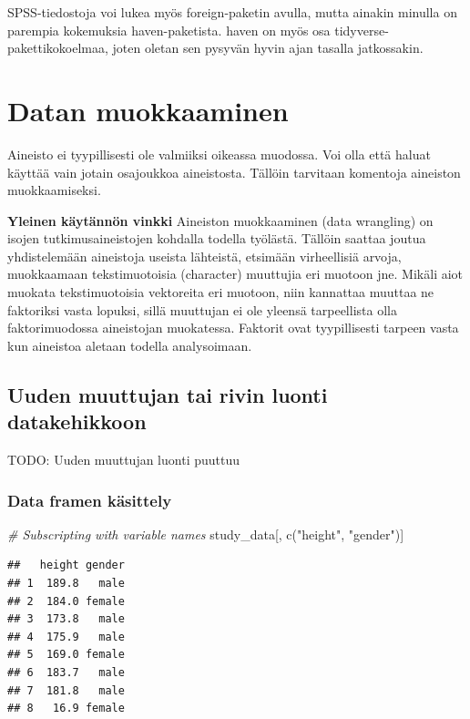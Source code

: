 \documentclass[
]{book}
\newenvironment{Shaded}{\begin{snugshade}}{\end{snugshade}}
\newcommand{\CommentTok}[1]{\textcolor[rgb]{0.56,0.35,0.01}{\textit{#1}}}
\newcommand{\FunctionTok}[1]{\textcolor[rgb]{0.00,0.00,0.00}{#1}}
\newcommand{\NormalTok}[1]{#1}
\newcommand{\StringTok}[1]{\textcolor[rgb]{0.31,0.60,0.02}{#1}}
\begin{document}
SPSS-tiedostoja voi lukea myös foreign-paketin avulla, mutta ainakin minulla on parempia kokemuksia haven-paketista. haven on myös osa tidyverse-pakettikokoelmaa, joten oletan sen pysyvän hyvin ajan tasalla jatkossakin.

\hypertarget{data-wrangling}{%
\chapter{Datan muokkaaminen}\label{data-wrangling}}

Aineisto ei tyypillisesti ole valmiiksi oikeassa muodossa. Voi olla että haluat käyttää vain jotain osajoukkoa aineistosta. Tällöin tarvitaan komentoja aineiston muokkaamiseksi.

\textbf{Yleinen käytännön vinkki}
Aineiston muokkaaminen (data wrangling) on isojen tutkimusaineistojen kohdalla todella työlästä. Tällöin saattaa joutua yhdistelemään aineistoja useista lähteistä, etsimään virheellisiä arvoja, muokkaamaan tekstimuotoisia (character) muuttujia eri muotoon jne. Mikäli aiot muokata tekstimuotoisia vektoreita eri muotoon, niin kannattaa muuttaa ne faktoriksi vasta lopuksi, sillä muuttujan ei ole yleensä tarpeellista olla faktorimuodossa aineistojan muokatessa. Faktorit ovat tyypillisesti tarpeen vasta kun aineistoa aletaan todella analysoimaan.

\hypertarget{data-frame-wrangling}{%
\section{Uuden muuttujan tai rivin luonti datakehikkoon}\label{data-frame-wrangling}}

TODO: Uuden muuttujan luonti puuttuu

\hypertarget{data-framen-kuxe4sittely}{%
\subsection{Data framen käsittely}\label{data-framen-kuxe4sittely}}

\begin{Shaded}
\begin{Highlighting}[]
\CommentTok{\# Subscripting with variable names}
\NormalTok{study\_data[, }\FunctionTok{c}\NormalTok{(}\StringTok{"height"}\NormalTok{, }\StringTok{"gender"}\NormalTok{)]}
\end{Highlighting}
\end{Shaded}

\begin{verbatim}
##   height gender
## 1  189.8   male
## 2  184.0 female
## 3  173.8   male
## 4  175.9   male
## 5  169.0 female
## 6  183.7   male
## 7  181.8   male
## 8   16.9 female
\end{verbatim}
\end{document}
